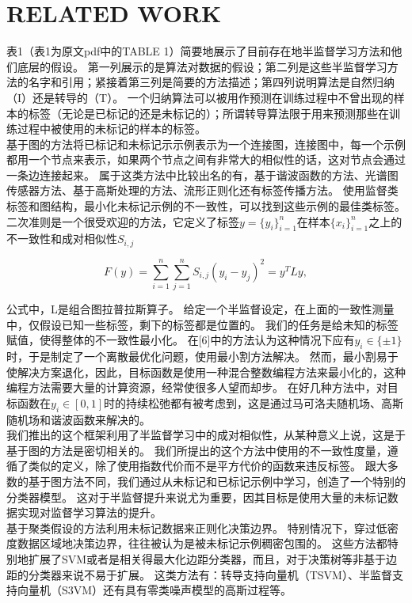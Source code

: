 \documentclass[10pt,journal,compsoc]{IEEEtran}
\begin{document}
\section{RELATED WORK}
表1（表1为原文pdf中的TABLE 1）简要地展示了目前存在地半监督学习方法和他们底层的假设。
第一列展示的是算法对数据的假设；第二列是这些半监督学习方法的名字和引用；紧接着第三列是简要的方法描述；第四列说明算法是自然归纳（I）还是转导的（T）。
一个归纳算法可以被用作预测在训练过程中不曾出现的样本的标签（无论是已标记的还是未标记的）；所谓转导算法限于用来预测那些在训练过程中被使用的未标记的样本的标签。\\
基于图的方法将已标记和未标记示示例表示为一个连接图，连接图中，每一个示例都用一个节点来表示，如果两个节点之间有非常大的相似性的话，这对节点会通过一条边连接起来。
属于这类方法中比较出名的有，基于谐波函数的方法、光谱图传感器方法、基于高斯处理的方法、流形正则化还有标签传播方法。
使用监督类标签和图结构，最小化未标记示例的不一致性，可以找到这些示例的最佳类标签。\\
二次准则是一个很受欢迎的方法，它定义了标签$y=\{y_i\}^n_{i=1}$在样本$\{x_i\}^n_{i=1}$之上的不一致性和成对相似性$S_{i,j}$\\
\begin{center}
\[F(y)=\sum_{i=1}^n\sum^n_{j=1}S_{i,j}(y_i-y_j)^2=y^TLy,\]
\end{center}
公式中，L是组合图拉普拉斯算子。
给定一个半监督设定，在上面的一致性测量中，仅假设已知一些标签，剩下的标签都是位置的。
我们的任务是给未知的标签赋值，使得整体的不一致性最小化。
在[6]中的方法认为这种情况下应有$y_i\in\{\pm1\}$时，于是制定了一个离散最优化问题，使用最小割方法解决。
然而，最小割易于使解决方案退化，因此，目标函数是使用一种混合整数编程方法来最小化的，这种编程方法需要大量的计算资源，经常使很多人望而却步。
在好几种方法中，对目标函数在$y_i\in[0,1]$时的持续松弛都有被考虑到，这是通过马可洛夫随机场、高斯随机场和谐波函数来解决的。\\
我们推出的这个框架利用了半监督学习中的成对相似性，从某种意义上说，这是于基于图的方法是密切相关的。
我们所提出的这个方法中使用的不一致性度量，遵循了类似的定义，除了使用指数代价而不是平方代价的函数来违反标签。
跟大多数的基于图方法不同，我们通过从未标记和已标记示例中学习，创造了一个特别的分类器模型。
这对于半监督提升来说尤为重要，因其目标是使用大量的未标记数据实现对监督学习算法的提升。\\
基于聚类假设的方法利用未标记数据来正则化决策边界。
特别情况下，穿过低密度数据区域地决策边界，往往被认为是被未标记示例稠密包围的。
这些方法都特别地扩展了SVM或者是相关得最大化边距分类器，而且，对于决策树等非基于边距的分类器来说不易于扩展。
这类方法有：转导支持向量机（TSVM）、半监督支持向量机（S3VM）还有具有零类噪声模型的高斯过程等。
\end{document}
